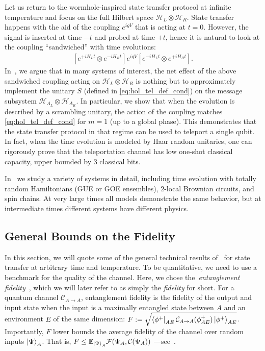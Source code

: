 \documentclass[aps,pra,reprint,floatfix,superscriptaddress, nofootinbib,longbibliography,onecolumn,notitlepage,12pt, tightenlines]{revtex4-1}
\newcommand{\EE}{\mathbb E}
\newcommand{\ot}{\otimes}
\newcommand{\Hil}{\mathcal H}
\newcommand{\ketum}{\ket {\phi^+}}
\newcommand{\braum}{\bra {\phi^+}}
\begin{document}
Let us return to the wormhole-inspired state transfer protocol at infinite temperature and focus on the full Hilbert space $\Hil_L\ot \Hil_R$. State transfer happens with the aid of the coupling $e^{igV}$ that is acting at $t=0$. However, the signal is inserted at time $-t$ and probed at time $+t$, hence it is natural to look at the coupling ``sandwiched'' with time evolutions:
\begin{align}\label{eq:sndc}
\left[e^{+iH_Lt} \ot e^{-iH_Rt} \right]e^{igV} \left[e^{-iH_Lt}\ot e^{+iH_Rt}\right].
\end{align}
In~\cite{longpaper}, we argue that in many systems of interest, the net effect of the above sandwiched coupling acting on $\Hil_L \ot \Hil_R$ is nothing but to approximately implement the unitary $S$ (defined in \cref{eq:hol_tel_def_cond}) on the message subsystem $\Hil_{A_L} \ot \Hil_{A_R}$. In particular, we show that when the evolution is described by a scrambling unitary, the action of the coupling matches \cref{eq:hol_tel_def_cond} for $m=1$ (up to a global phase). This demonstrates that the state transfer protocol in that regime can be used to teleport a single qubit. In fact, when the time evolution is modeled by Haar random unitaries, one can rigorously prove that the teleportation channel has low one-shot classical capacity, upper bounded by $3$ classical bits.

In~\cite{longpaper} we study a variety of systems in detail, including time evolution with totally random Hamiltonians (GUE or GOE ensembles), $2$-local Brownian circuits, and spin chains. At very large times all models demonstrate the same behavior, but at intermediate times different systems have different physics. 

\subsection{General Bounds on the Fidelity}\label{subsec:TS_Hamiltonian_General}
In this section, we will quote some of the general technical results of~\cite{longpaper} for state transfer at arbitrary time and temperature. To be quantitative, we need to use a benchmark for the quality of the channel. Here, we chose the~\emph{entanglement fidelity}~\cite{schumacher1996sending}, which we will later refer to as simply the \emph{fidelity} for short.
For a quantum channel $\mathcal C_{A\rightarrow A}$, entanglement fidelity is the fidelity of the output and input state when the input is a maximally entangled state between $A$ and an environment $E$ of the same dimension:  $F := \sqrt{\braum_{AE} \mathcal C_{A\rightarrow A}(\phi^{+}_{AE})\ketum_{AE}}$. Importantly, $F$ lower bounds the average fidelity of the channel over random inputs $\ket \Psi_A$. That is, $F \leq \EE_{\ket{\Psi}_A}\mathcal F(\Psi_A,\mathcal C(\Psi_A))$ ---see~\cite{schumacher1996sending}.
\end{document}
